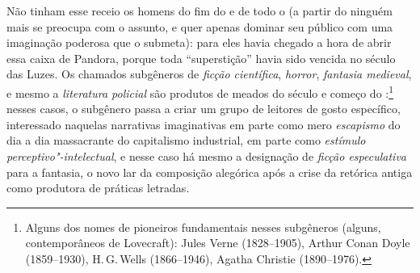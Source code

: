 Não tinham esse receio os homens do fim do  e de todo o  (a
partir do  ninguém mais se preocupa com o assunto, e quer apenas
dominar seu público com uma imaginação poderosa que o submeta): para
eles havia chegado a hora de abrir essa caixa de Pandora, porque toda
``superstição'' havia sido vencida no século das Luzes. Os chamados
subgêneros de \emph{ficção científica}, \emph{horror}, \emph{fantasia
medieval}, e mesmo a \emph{literatura policial} são produtos de meados
do século  e começo do :\footnote{Alguns dos nomes de pioneiros
  fundamentais nesses subgêneros (alguns, contemporâneos de Lovecraft):
  Jules Verne (1828--1905), Arthur Conan Doyle (1859--1930), H.\,G.\,Wells
  (1866--1946), Agatha Christie (1890--1976).} nesses casos, o subgênero
passa a criar um grupo de leitores de gosto específico, interessado
naquelas narrativas imaginativas em parte como mero \emph{escapismo} do
dia a dia massacrante do capitalismo industrial, em parte como
\emph{estímulo perceptivo"-intelectual}, e nesse caso há mesmo a
designação de \emph{ficção especulativa} para a fantasia, o novo lar da
composição alegórica após a crise da retórica antiga como produtora de
práticas letradas.

